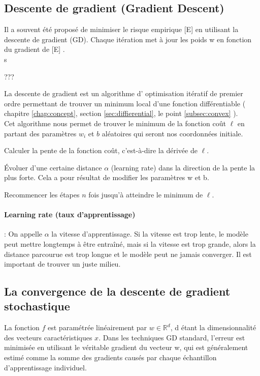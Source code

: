 	
	\subsection{Descente de gradient (Gradient Descent)} \label{sec:gradient_descent}
	
	Il a souvent été proposé de minimiser le risque empirique [E] en utilisant la descente de gradient (GD). Chaque itération met à jour les poids w en fonction du gradient de [E] \cite{bottou2012stochastic}.\\
	s
	
	???
	
	La descente de gradient est un algorithme d' optimisation itératif de premier ordre permettant de trouver un minimum local d'une fonction différentiable (\cf$ \ $chapitre \ref{chap:concept}, section \ref{sec:diffierential}, le point \ref{subsec:convex} ).\\
	Cet algorithme nous permet de trouver le minimum de la fonction coût $\ell$  en partant des paramètres $w_i$ et $b$ aléatoires qui seront nos coordonnées initiale.
	\begin{list}{--}{}
		\item Calculer la pente de la fonction coût, c’est-à-dire la dérivée de $\ell$.
		\item Évoluer d’une certaine distance $\alpha$ (learning rate) dans la direction de la pente la plus forte. Cela a pour résultat de modifier les paramètres w et b.
		\item Recommencer les étapes $n$ fois jusqu’à atteindre le minimum de $\ell$.
	\end{list}
	\paragraph*{Learning rate (taux d’apprentissage)}: On appelle $\alpha$ la vitesse d’apprentissage.
	Si la vitesse est trop lente, le modèle peut mettre longtemps à être entraîné, mais si la vitesse est trop grande, alors la distance parcourue est trop longue et le modèle peut ne jamais converger. Il est important de trouver un juste milieu. 

		
	\subsection{La convergence de la descente de gradient stochastique} \label{sec:convergence_sgd}
	
	La fonction $f$ est paramétrée linéairement par $w \in \mathbb{R}^d$, d étant la dimensionnalité des vecteurs caractéristiques $x$. Dans les techniques GD standard, l’erreur est minimisée en utilisant le véritable gradient du vecteur w, qui est généralement estimé comme la somme des gradients causés par chaque échantillon d'apprentissage individuel.
	
